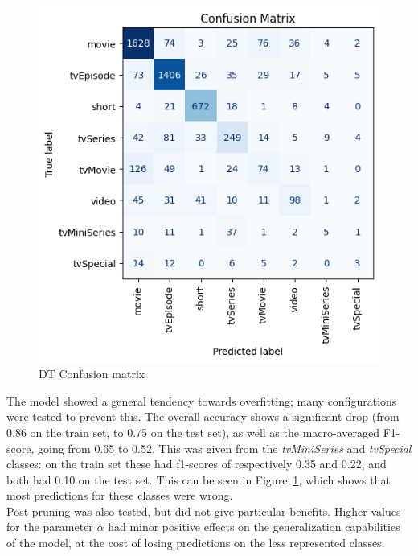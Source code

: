 \begin{figure}
    \centering
    \captionsetup{justification=raggedleft, width=1\linewidth}
    \caption{DT Confusion matrix}
    \label{fig:multiclass_dt_conf_matrix}
    \includegraphics[width=0.9\linewidth]{plots/multiclass_dt_conf_matrix.png}
\end{figure}
The model showed a general tendency towards overfitting; many configurations were tested to prevent
this. The overall accuracy shows a significant drop (from 0.86 on the train set, to 0.75 on the test set),
as well as the macro-averaged F1-score, going from 0.65 to 0.52.
This was given from the \textit{tvMiniSeries} and \textit{tvSpecial} classes: on the train set these had f1-scores of
respectively 0.35 and 0.22, and both had 0.10 on the test set.
This can be seen in Figure~\ref{fig:multiclass_dt_conf_matrix}, which shows
that most predictions for these classes were wrong.\\
Post-pruning was also tested, but did not give particular benefits.
Higher values for the parameter $\alpha$ had minor positive effects on the generalization
capabilities of the model, at the cost of losing predictions on the less represented classes.\\


